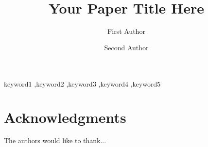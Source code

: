 \documentclass[review]{elsarticle}
\begin{document}
\begin{frontmatter}

\title{Your Paper Title Here}

\author[1]{First Author}
\author[2]{Second Author}






\begin{keyword}
keyword1 \sep keyword2 \sep keyword3 \sep keyword4 \sep keyword5
\end{keyword}

\end{frontmatter}

\linenumbers







\section*{Acknowledgments}
The authors would like to thank...



\end{document}
